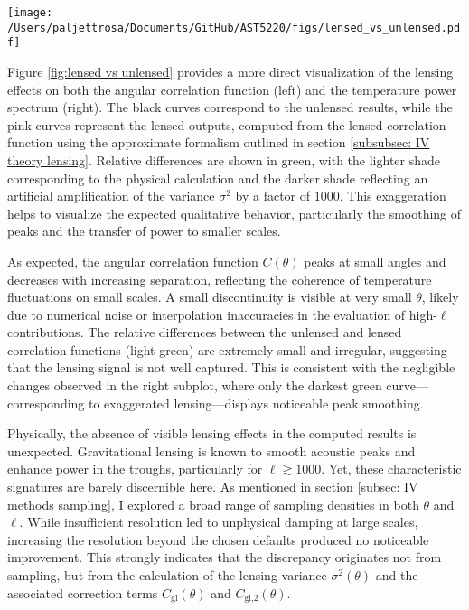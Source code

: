 \documentclass{aa}
\numberwithin{equation}{section}
\numberwithin{table}{section}
\numberwithin{figure}{section}
\begin{document}
\begin{figure*}
\centering
\texttt{[image: /Users/paljettrosa/Documents/GitHub/AST5220/figs/lensed\_vs\_unlensed.pdf]}
\caption{Comparison of unlensed (black) and lensed (pink) angular correlation functions (left) and temperature power spectra (right), with relative differences shown in green. Darker colors correspond to an exaggerated lensing variance $\sigma^2 \rightarrow 1000 \sigma^2$, highlighting the sensitivity of the results to this parameter. Insets zoom in on small differences and smoothing effects at intermediate to high multipoles.}\label{fig:lensed vs unlensed}
\end{figure*}

Figure \ref{fig:lensed vs unlensed} provides a more direct visualization of the lensing effects on both the angular correlation function (left) and the temperature power spectrum (right). The black curves correspond to the unlensed results, while the pink curves represent the lensed outputs, computed from the lensed correlation function using the approximate formalism outlined in section \ref{subsubsec: IV theory lensing}. Relative differences are shown in green, with the lighter shade corresponding to the physical calculation and the darker shade reflecting an artificial amplification of the variance $\sigma^2$ by a factor of 1000. This exaggeration helps to visualize the expected qualitative behavior, particularly the smoothing of peaks and the transfer of power to smaller scales.

As expected, the angular correlation function $C(\theta)$ peaks at small angles and decreases with increasing separation, reflecting the coherence of temperature fluctuations on small scales. A small discontinuity is visible at very small $\theta$, likely due to numerical noise or interpolation inaccuracies in the evaluation of high-$\ell$ contributions. The relative differences between the unlensed and lensed correlation functions (light green) are extremely small and irregular, suggesting that the lensing signal is not well captured. This is consistent with the negligible changes observed in the right subplot, where only the darkest green curve—corresponding to exaggerated lensing—displays noticeable peak smoothing.

Physically, the absence of visible lensing effects in the computed results is unexpected. Gravitational lensing is known to smooth acoustic peaks and enhance power in the troughs, particularly for $\ell \gtrsim 1000$. Yet, these characteristic signatures are barely discernible here. As mentioned in section \ref{subsec: IV methods sampling}, I explored a broad range of sampling densities in both $\theta$ and $\ell$. While insufficient resolution led to unphysical damping at large scales, increasing the resolution beyond the chosen defaults produced no noticeable improvement. This strongly indicates that the discrepancy originates not from sampling, but from the calculation of the lensing variance $\sigma^2(\theta)$ and the associated correction terms $C_\text{gl}(\theta)$ and $C_\text{gl,2}(\theta)$.
\end{document}
